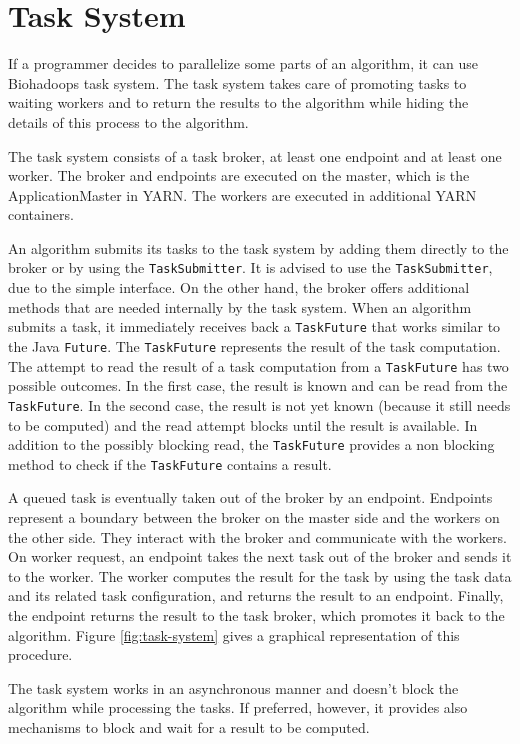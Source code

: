 \section{Task System}
\label{chap:impl:task-system}
If a programmer decides to parallelize some parts of an algorithm, it can use Biohadoops task system. The task system takes care of promoting tasks to waiting workers and to return the results to the algorithm while hiding the details of this process to the algorithm.

The task system consists of a task broker, at least one endpoint and at least one worker. The broker and endpoints are executed on the master, which is the ApplicationMaster in YARN. The workers are executed in additional YARN containers.

An algorithm submits its tasks to the task system by adding them directly to the broker or by using the \texttt{TaskSubmitter}. It is advised to use the \texttt{TaskSubmitter}, due to the simple interface. On the other hand, the broker offers additional methods that are needed internally by the task system. When an algorithm submits a task, it immediately receives back a \texttt{TaskFuture} that works similar to the Java \texttt{Future}. The \texttt{TaskFuture} represents the result of the task computation. The attempt to read the result of a task computation from a \texttt{TaskFuture} has two possible outcomes. In the first case, the result is known and can be read from the \texttt{TaskFuture}. In the second case, the result is not yet known (because it still needs to be computed) and the read attempt blocks until the result is available. In addition to the possibly blocking read, the \texttt{TaskFuture} provides a non blocking method to check if the \texttt{TaskFuture} contains a result.

A queued task is eventually taken out of the broker by an endpoint. Endpoints represent a boundary between the broker on the master side and the workers on the other side. They interact with the broker and communicate with the workers. On worker request, an endpoint takes the next task out of the broker and sends it to the worker. The worker computes the result for the task by using the task data and its related task configuration, and returns the result to an endpoint. Finally, the endpoint returns the result to the task broker, which promotes it back to the algorithm. Figure \ref{fig:task-system} gives a graphical representation of this procedure.

The task system works in an asynchronous manner and doesn't block the algorithm while processing the tasks. If preferred, however, it provides also mechanisms to block and wait for a result to be computed.

